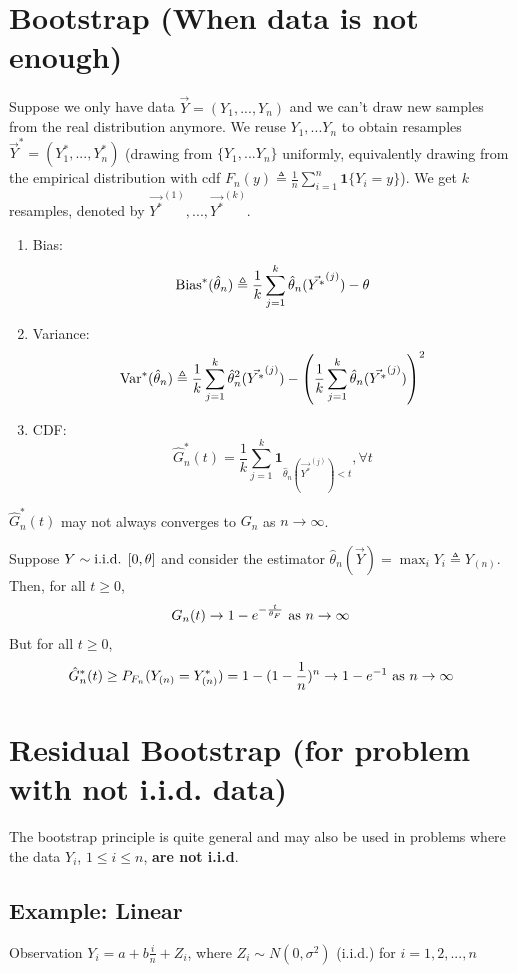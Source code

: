 \documentclass[11pt]{elegantbook}
\begin{document}
\section{Bootstrap (When data is not enough)}
Suppose we only have data $\vec{Y}=(Y_1,...,Y_n)$ and we can't draw new samples from the real distribution anymore. We reuse $Y_1,...Y_n$ to obtain resamples $\vec{Y}^*=(Y_1^*,...,Y_n^*)$ (drawing from $\{Y_1,...Y_n\}$ uniformly, equivalently drawing from the empirical distribution with cdf $F_n(y)\triangleq \frac{1}{n}\sum_{i=1}^n\mathbf{1}\{Y_i=y\}$). We get $k$ resamples, denoted by ${\vec{Y^*}}^{(1)},...,{\vec{Y^*}}^{(k)}$.
\begin{enumerate}
    \item Bias: $$\textnormal{Bias}^*(\hat{\theta}_n)\triangleq\frac{1}{k}\sum_{j=1}^k \hat{\theta}_n(\vec{Y^*}^{(j)})-\theta$$
    \item Variance: $$\textnormal{Var}^*(\hat{\theta}_n)\triangleq\frac{1}{k}\sum_{j=1}^k \hat{\theta}^2_n(\vec{Y^*}^{(j)})-\left(\frac{1}{k}\sum_{j=1}^k \hat{\theta}_n(\vec{Y^*}^{(j)})\right)^2$$
    \item CDF: $$\hat{G}^*_{n}(t)=\frac{1}{k}\sum_{j=1}^k \mathbf{1}_{\hat{\theta}_n(\vec{Y^*}^{(j)})<t},\forall t$$
\end{enumerate}
\begin{note}
    $\hat{G}^*_{n}(t)$ may not always converges to $G_n$ as $n \rightarrow \infty$.
\end{note}
\begin{example}
    Suppose $Y\sim \textnormal{i.i.d. }[0,\theta]$ and consider the estimator $\hat{\theta}_n(\vec{Y})=\max_i Y_i\triangleq Y_{(n)}$. Then, for all $t\geq 0$, $$G_n(t) \rightarrow 1-e^{-\frac{t}{\theta_F}}\textnormal{ as }n \rightarrow \infty$$
    But for all $t\geq 0$, $$\hat{G}^*_{n}(t)\geq P_{F_n}(Y_{(n)}=Y^*_{(n)})=1-(1-\frac{1}{n})^n \rightarrow  1-e^{-1} \textnormal{ as }n \rightarrow \infty$$
\end{example}


\section{Residual Bootstrap (for problem with not i.i.d. data)}
The bootstrap principle is quite general and may also be used in problems where the data $Y_i$, $1\leq i\leq n$, \textbf{are not i.i.d}.

\subsection*{Example: Linear}
Observation $Y_i=a+b\frac{i}{n}+Z_i$, where $Z_i\sim N(0,\sigma^2)$ (i.i.d.) for $i=1,2,...,n$
\end{document}
